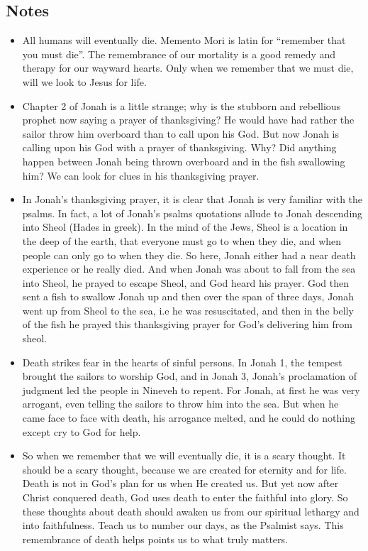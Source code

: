 \subsection*{Notes}
\begin{itemize}
  \item{All humans will eventually die. Memento Mori is latin for “remember that you must die”. The remembrance of our mortality is a good remedy and therapy for our wayward hearts. Only when we remember that we must die, will we look to Jesus for life.}
  \item{Chapter 2 of Jonah is a little strange; why is the stubborn and rebellious prophet now saying a prayer of thanksgiving? He would have had rather the sailor throw him overboard than to call upon his God. But now Jonah is calling upon his God with a prayer of thanksgiving. Why? Did anything happen between Jonah being thrown overboard and in the fish swallowing him? We can look for clues in his thanksgiving prayer.}
  \item{In Jonah’s thanksgiving prayer, it is clear that Jonah is very familiar with the psalms. In fact, a lot of Jonah’s psalms quotations allude to Jonah descending into Sheol (Hades in greek). In the mind of the Jews, Sheol is a location in the deep of the earth, that everyone must go to when they die, and when people can only go to when they die. So here, Jonah either had a near death experience or he really died. And when Jonah was about to fall from the sea into Sheol, he prayed to escape Sheol, and God heard his prayer. God then sent a fish to swallow Jonah up and then over the span of three days, Jonah went up from Sheol to the sea, i.e he was resuscitated, and then in the belly of the fish he prayed this thanksgiving prayer for God’s delivering him from sheol.}
  \item{Death strikes fear in the hearts of sinful persons. In Jonah 1, the tempest brought the sailors to worship God, and in Jonah 3, Jonah’s proclamation of judgment led the people in Nineveh to repent. For Jonah, at first he was very arrogant, even telling the sailors to throw him into the sea. But when he came face to face with death, his arrogance melted, and he could do nothing except cry to God for help. }
  \item{So when we remember that we will eventually die, it is a scary thought. It should be a scary thought, because we are created for eternity and for life. Death is not in God’s plan for us when He created us. But yet now after Christ conquered death, God uses death to enter the faithful into glory. So these thoughts about death should awaken us from our spiritual lethargy and into faithfulness. Teach us to number our days, as the Psalmist says. This remembrance of death helps points us to what truly matters. }

\end{itemize}
